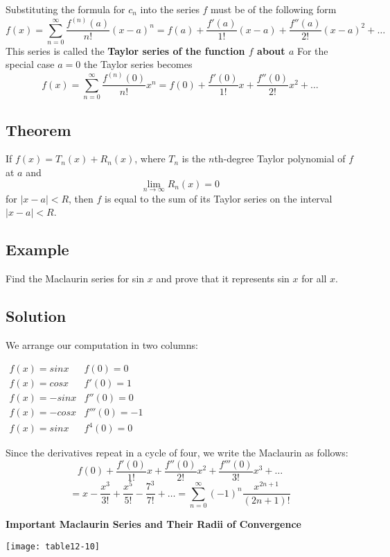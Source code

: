 Substituting the formula for $c_n$ into the series $f$ must be of the following form
$$ f(x)=\sum_{n=0}^\infty \frac{f^{(n)}(a)}{n!} (x-a)^n=f(a)+\frac{f'(a)}{1!}(x-a)+\frac{f''(a)}{2!}(x-a)^2+\dots $$
This series is called the \textbf{Taylor series of the function $f$ about $a$}
For the special case $a=0$ the Taylor series becomes
$$ f(x)=\sum_{n=0}^\infty \frac{f^{(n)}(0)}{n!}x^n=f(0)+\frac{f'(0)}{1!}x+\frac{f''(0)}{2!}x^2+\dots $$

\subsection*{Theorem}
If $f(x)=T_n(x)+R_n(x)$, where $T_n$ is the $n$th-degree Taylor polynomial of $f$ at $a$ and
$$ \lim_{n \to \infty} R_n(x)=0 $$
for $|x-a|<R$, then $f$ is equal to the sum of its Taylor series on the interval $|x-a|<R$.

\subsection*{Example}
Find the Maclaurin series for sin $x$ and prove that it represents sin $x$ for all $x$.

\subsection*{Solution}
We arrange our computation in two columns:
\begin{center}
    $\begin{array}{ll}
            f(x)=sinx  & f(0)=0     \\
            f(x)=cosx  & f'(0)=1    \\
            f(x)=-sinx & f''(0)=0   \\
            f(x)=-cosx & f'''(0)=-1 \\
            f(x)=sinx  & f^{4}(0)=0
        \end{array}$
\end{center}

Since the derivatives repeat in a cycle of four, we write the Maclaurin as follows:
$$ f(0)+\frac{f'(0)}{1!}x+\frac{f''(0)}{2!}x^2+\frac{f'''(0)}{3!}x^3+\dots$$
$$=x-\frac{x^3}{3!}+\frac{x^5}{5!}-\frac{7^3}{7!}+\dots=\sum_{n=0}^\infty(-1)^n\frac{x^{2n+1}}{(2n+1)!} $$
\pagebreak

\textbf{Important Maclaurin Series and Their Radii of Convergence}
\begin{center}
    \texttt{[image: table12-10]}
\end{center}

